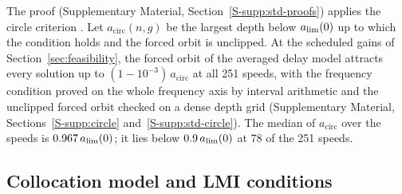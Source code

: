 The proof (Supplementary Material, Section~\ref{S-supp:std-proofs}) applies the circle criterion \citep{zames1966inputII,desoer1975feedback}. Let $a_{\mathrm{circ}}(n,g)$ be the largest depth below $a_{\lim}(0)$ up to which the condition holds and the forced orbit is unclipped. At the scheduled gains of Section~\ref{sec:feasibility}, the forced orbit of the averaged delay model attracts every solution up to $(1-10^{-3})\,a_{\mathrm{circ}}$ at all 251 speeds, with the frequency condition proved on the whole frequency axis by interval arithmetic and the unclipped forced orbit checked on a dense depth grid (Supplementary Material, Sections~\ref{S-supp:circle} and~\ref{S-supp:std-circle}). The median of $a_{\mathrm{circ}}$ over the speeds is $0.967\,a_{\lim}(0)$; it lies below $0.9\,a_{\lim}(0)$ at 78 of the 251 speeds.

\subsection{Collocation model and LMI conditions}\label{sec:cert-model}\label{sec:cert-lmi}

